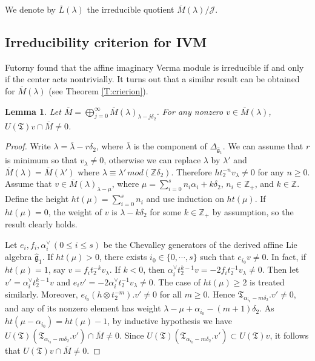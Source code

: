 \documentclass[11pt]{amsproc}
\newtheorem{lemma}[theorem]{Lemma}
\theoremstyle{definition}
\theoremstyle{remark}
\numberwithin{equation}{section} \errorcontextlines=0
\begin{document}
We denote by $\overline{L}(\lambda)$ the irreducible quotient
$\overline{M}(\lambda)/\mathcal {J}$.

\subsection{Irreducibility criterion for IVM}
Futorny \cite{F} found that the affine imaginary Verma module is irreducible
if and only if the center acts nontrivially. It turns out that
a similar result can be obtained for $\overline{M}(\lambda)$
(see Theorem \ref{T:crierion}).

\begin{lemma}\label{1}
Let $\overline{M}=\bigoplus_{j=0}^{\infty}\overline{M}({\lambda})_{{\lambda}-j\delta_2}$.
For any nonzero $v\in \overline{M}(\lambda)$,
$U(\mathfrak T)v\cap \overline{M}\neq 0$.
\end{lemma}
\begin{proof} Write $\lambda=\overline{\lambda}-r\delta_2$, where $\overline{\lambda}$
is the component of $\Delta_{\hat{\mathfrak g}_1}$. We can assume that
$r$ is minimum so that $v_{\lambda}\neq 0$, otherwise we can replace
$\lambda$ by $\lambda'$ and $\overline{M}(\lambda)=\overline{M}(\lambda')$ where
$\lambda\equiv\lambda'\, mod(\mathbb Z\delta_2)$. Therefore $ht_2^{-n}v_{\lambda}\neq 0$
for any $n\geq 0$.
Assume that $v\in \overline{M}(\lambda)_{\lambda-\mu}$,
where $\mu=\sum\limits_{i=0}^s n_{i}\alpha_{i}+k\delta_2$,
$n_i\in\mathbb{Z}_+$, and $k\in \mathbb{Z}$. Define the height $ht(\mu)= \sum\limits_{i=0}^s n_i$ and use
induction on $ht(\mu)$. If
$ht(\mu)=0$, the weight of $v$ is $\lambda-k\delta_2$ for some
$k\in\mathbb Z_+$ by assumption, so the result clearly holds.

Let $e_i, f_i, \alpha_i^{\vee} \, (0\leq i\leq s)$ be the Chevalley
generators of the derived affine Lie algebra $\hat{\mathfrak g}_1$.
If $ht(\mu)>0$, there exists $i_0\in\{0, \cdots, s\}$ such that
$e_{i_0}v\neq 0$. In fact, if $ht(\mu)=1$, say
$v=f_it_2^{-k}v_{\lambda}$. If $k<0$, then
$\alpha_i^{\vee}t_2^{k-1}v=-2f_it_2^{-1}v_{\lambda}\neq 0$. Then let
$v'=\alpha_i^{\vee}t_2^{k-1}v$ and
$e_iv'=-2\alpha_i^{\vee}t_2^{-1}v_{\lambda}\neq0$. The
case of $ht(\mu)\geq 2$ is treated similarly. Moreover,
$e_{i_0}(h\otimes t_2^{-m}).v'\neq 0$ for all $m\geq 0$. Hence
$\mathfrak T_{\alpha_{i_0}-m\delta_2}.v'\neq 0$, and any of its
nonzero element has weight ${\lambda}-\mu+\alpha_{i_0}-(m+1)\delta_2$. As
$ht(\mu-\alpha_{i_0})=ht(\mu)-1$, by inductive hypothesis we have
$U(\mathfrak T)(\mathfrak T_{\alpha_{i_0}-m\delta_2}.v')\cap
\overline{M}\neq 0$. Since $U(\mathfrak T)(\mathfrak
T_{\alpha_{i_0}-m\delta_2}.v') \subset U(\mathfrak T)v$, it follows
that $U(\mathfrak T)v\cap \overline{M}\neq 0$.\end{proof}
\end{document}
